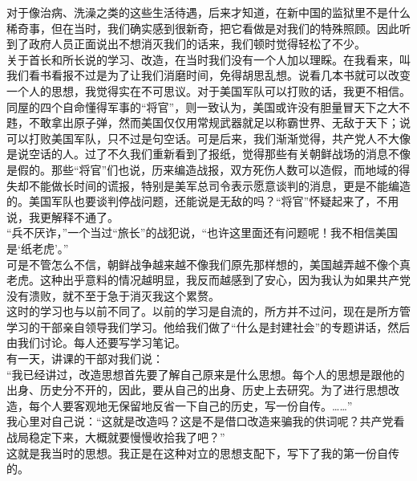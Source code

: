 对于像治病、洗澡之类的这些生活待遇，后来才知道，在新中国的监狱里不是什么稀奇事，但在当时，我们确实感到很新奇，把它看做是对我们的特殊照顾。因此听到了政府人员正面说出不想消灭我们的话来，我们顿时觉得轻松了不少。\\

关于首长和所长说的学习、改造，在当时我们没有一个人加以理睬。在我看来，叫我们看书看报不过是为了让我们消磨时间，免得胡思乱想。说看几本书就可以改变一个人的思想，我觉得实在不可思议。对于美国军队可以打败的话，我更不相信。同屋的四个自命懂得军事的“将官”，则一致认为，美国或许没有胆量冒天下之大不韪，不敢拿出原子弹，然而美国仅仅用常规武器就足以称霸世界、无敌于天下；说可以打败美国军队，只不过是句空话。可是后来，我们渐渐觉得，共产党人不大像是说空话的人。过了不久我们重新看到了报纸，觉得那些有关朝鲜战场的消息不像是假的。那些“将官”们也说，历来编造战报，双方死伤人数可以造假，而地域的得失却不能做长时间的谎报，特别是美军总司令表示愿意谈判的消息，更是不能编造的。美国军队也要谈判停战问题，还能说是无敌的吗？“将官”怀疑起来了，不用说，我更解释不通了。\\

“兵不厌诈，”一个当过“旅长”的战犯说，“也许这里面还有问题呢！我不相信美国是‘纸老虎’。”\\

可是不管怎么不信，朝鲜战争越来越不像我们原先那样想的，美国越弄越不像个真老虎。这种出乎意料的情况越明显，我反而越感到了安心，因为我认为如果共产党没有溃败，就不至于急于消灭我这个累赘。\\

这时的学习也与以前不同了。以前的学习是自流的，所方并不过问，现在是所方管学习的干部亲自领导我们学习。他给我们做了“什么是封建社会”的专题讲话，然后由我们讨论。每人还要写学习笔记。\\

有一天，讲课的干部对我们说：\\

“我已经讲过，改造思想首先要了解自己原来是什么思想。每个人的思想是跟他的出身、历史分不开的，因此，要从自己的出身、历史上去研究。为了进行思想改造，每个人要客观地无保留地反省一下自己的历史，写一份自传。……”\\

我心里对自己说：“这就是改造吗？这是不是借口改造来骗我的供词呢？共产党看战局稳定下来，大概就要慢慢收拾我了吧？”\\

这就是我当时的思想。我正是在这种对立的思想支配下，写下了我的第一份自传的。